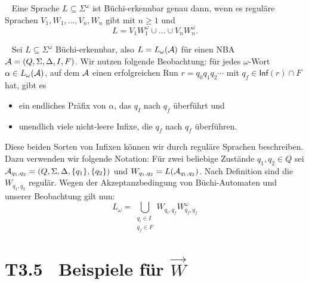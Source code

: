 \documentclass[fontsize=11pt, twoside=false, numbers=autoenddot]{scrbook}
\begin{document}
~
Eine Sprache $L \subseteq \Sigma^\omega$ ist Büchi-erkennbar
genau dann,
wenn es reguläre Sprachen $V_1,W_1,\dots,V_n,W_n$ gibt mit $n \geqslant 1$ und
\[
  L = V_1W_1^\omega \cup \dots \cup V_nW_n^\omega.
\]

\par\medskip
{}~
Sei $L \subseteq \Sigma^\omega$ Büchi-erkennbar,
also $L = L_\omega(\mathcal{A})$ für einen NBA $\mathcal{A} = (Q,\Sigma,\Delta,I,F)$.
Wir nutzen folgende Beobachtung: für jedes $\omega$-Wort $\alpha \in L_\omega(\mathcal{A})$,
auf dem $\mathcal{A}$ einen erfolgreichen Run $r = q_0q_1q_2\cdots$
mit $q_f \in \textsf{Inf}(r) \cap F$ hat, gibt es
%
\begin{itemize}
  \item
    ein endliches Präfix von $\alpha$, das $q_I$ nach $q_f$ überführt und
  \item
    unendlich viele nicht-leere Infixe, die $q_f$ nach $q_f$ überführen.
\end{itemize}
%
Diese beiden Sorten von Infixen können wir durch reguläre Sprachen beschreiben.
Dazu verwenden wir folgende Notation: Für zwei beliebige Zustände $q_1,q_2 \in Q$
sei $\mathcal{A}_{q_1,q_2} = (Q,\Sigma,\Delta,\{q_1\},\{q_2\})$
und $W_{q_1,q_2} = L(\mathcal{A}_{q_1,q_2})$.
Nach Definition sind die $W_{q_1,q_2}$ regulär.
Wegen der Akzeptanzbedingung von Büchi-Automaten und unserer Beobachtung gilt nun:
\[
  L_\omega = \bigcup_{\substack{q_i \in I\\q_f \in F}} W_{q_i,q_f} W_{q_f,q_f}^\omega
\]
\qedhere

\section*{T3.5~ Beispiele für {\boldmath $\Vec W$}}
\end{document}
